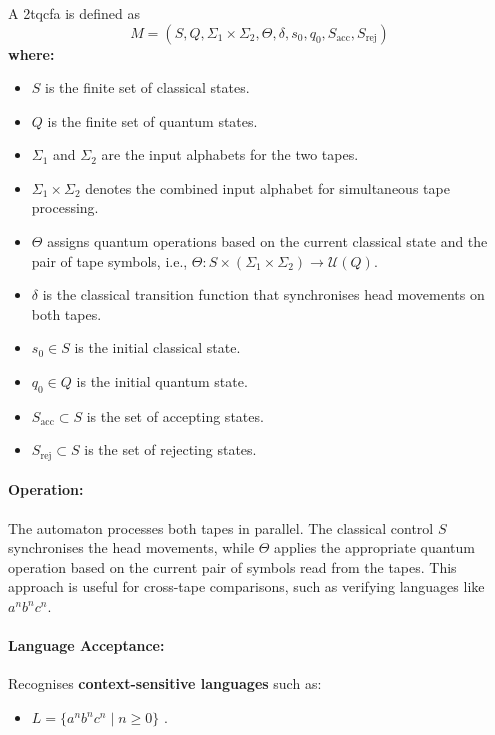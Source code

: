 \subsubsection{}
\label{subsec:2tqcfa}
\begin{definition}
A \gls{2tqcfa} is defined as 
\[
M = (S, Q, \Sigma_1 \times \Sigma_2, \Theta, \delta, s_0, q_0, S_{\text{acc}}, S_{\text{rej}})
\]
\textbf{where:}
\begin{itemize}
    \item \( S \) is the finite set of classical states.
    \item \( Q \) is the finite set of quantum states.
    \item \( \Sigma_1 \) and \( \Sigma_2 \) are the input alphabets for the two tapes.
    \item \( \Sigma_1 \times \Sigma_2 \) denotes the combined input alphabet for simultaneous tape processing.
    \item \( \Theta \) assigns quantum operations based on the current classical state and the pair of tape symbols, i.e., \(\Theta: S \times (\Sigma_1 \times \Sigma_2) \to \mathcal{U}(Q)\).
    \item \( \delta \) is the classical transition function that synchronises head movements on both tapes.
    \item \( s_0 \in S \) is the initial classical state.
    \item \( q_0 \in Q \) is the initial quantum state.
    \item \( S_{\text{acc}} \subset S \) is the set of accepting states.
    \item \( S_{\text{rej}} \subset S \) is the set of rejecting states.
\end{itemize}
\end{definition}

\paragraph{Operation:}  
The automaton processes both tapes in parallel. The classical control \( S \) synchronises the head movements, while \( \Theta \) applies the appropriate quantum operation based on the current pair of symbols read from the tapes. This approach is useful for cross-tape comparisons, such as verifying languages like \( a^n b^n c^n \).

\paragraph{Language Acceptance:}  
Recognises \textbf{context-sensitive languages} such as:
\begin{itemize}
    \item \( L = \{a^n b^n c^n \mid n \geq 0\} \) \cite{zheng2012two, gruska2005}.
\end{itemize}

